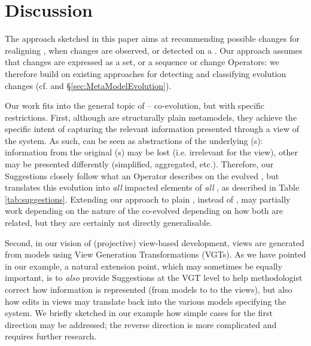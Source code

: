 \section{Discussion}
\label{sec:Discussion}

The approach sketched in this paper aims at recommending possible changes 
for realigning \viewtypes, when changes are observed, or detected on a 
\metamodel. Our approach assumes that \metamodel changes are expressed
as a set, or a sequence or change \textsf{Operator}s: we therefore build
on existing approaches for detecting and classifying evolution changes
(cf. \cite{herrmannsdoerfer_extensive_2011,khelladi_detecting_2015} and 
\S \ref{sec:MetaModelEvolution}).

Our work fits into the general topic of \metamodel -- \metamodel co-evolution,
but with specific restrictions. First, although \viewtypes are structurally 
plain metamodels, they achieve the specific intent of capturing the relevant
information presented through a view of the system. As such, \viewtypes can
be seen as abstractions of the underlying \metamodel{}(s): information from
the original \metamodel{}(s) may be lost (i.e. irrelevant for the view), other
may be presented differently (simplified, aggregated, etc.). Therefore, our
\textsf{Suggestion}s closely follow what an \textsf{Operator} describes on
the evolved \metamodel, but translates this evolution into \emph{all} impacted
elements of \emph{all} \viewtypes, as described in Table \ref{tab:suggestions}.
Extending our approach to plain \metamodels, instead of \viewtypes, may partially
work depending on the nature of the co-evolved \metamodels depending on how
both \metamodels are related, but they are certainly not directly generalisable.

Second, in our vision of (projective) view-based development, views are generated
from models using View Generation Transformations (VGTs). As we have pointed in our
example, a natural extension point, which may sometimes be equally important,
is to \emph{also} provide \textsf{Suggestion}s at the VGT level to help 
methodologist correct how information is represented (from models to to the views),
but also how edits in views may translate back into the various models specifying
the system. We briefly sketched in our example how simple cases for the first 
direction may be addressed; the reverse direction is more complicated and requires
further research.




